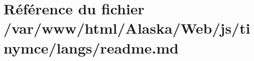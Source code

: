 \hypertarget{_web_2js_2tinymce_2langs_2_r_e_a_d_m_e_8md}{}\section{Référence du fichier /var/www/html/\+Alaska/\+Web/js/tinymce/langs/readme.md}
\label{_web_2js_2tinymce_2langs_2_r_e_a_d_m_e_8md}
